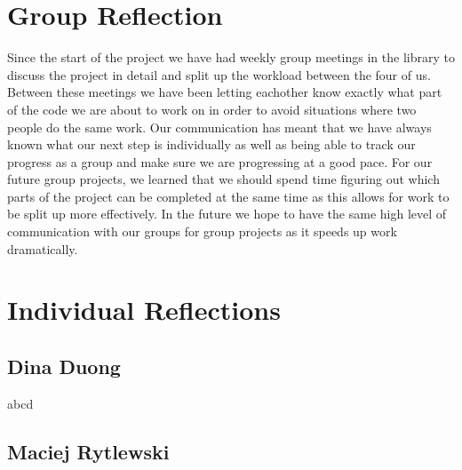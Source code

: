 \documentclass[11pt]{article}
\begin{document}
\section{Group Reflection}

Since the start of the project we have had weekly group meetings in the library to discuss the project in
detail and split up the workload between the four of us. Between these meetings we have been letting eachother 
know exactly what part of the code we are about to work on in order to avoid situations where two people do the 
same work. Our communication has meant that we have always known what our next step is individually as well as 
being able to track our progress as a group and make sure we are progressing at a good pace.
For our future group projects, we learned that we should spend time figuring out which parts of the project can 
be completed at the same time as this allows for work to be split up more effectively.
In the future we hope to have the same high level of communication with our groups for group projects as it 
speeds up work dramatically.

\section{Individual Reflections}

\subsection{Dina Duong}

abcd

\subsection{Maciej Rytlewski}
\end{document}
